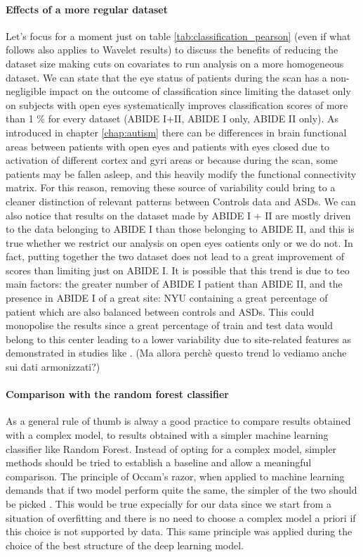 \documentclass[10pt]{report}
\begin{document}
\paragraph{Effects of a more regular dataset}
Let's focus for a moment just on table \ref{tab:classification_pearson} (even if what follows also applies to Wavelet results) to discuss the benefits of reducing the dataset size making cuts on covariates to run analysis on a more homogeneous dataset.
We can state that the eye status of patients during the scan has a non-negligible impact on the outcome of classification since limiting the dataset only on subjects with open eyes systematically improves classification scores of more than 1 \% for every dataset (ABIDE I+II, ABIDE I only, ABIDE II only).
As introduced in chapter \ref{chap:autism} there can be differences in brain functional areas between patients with open eyes and patients with eyes closed due to activation of different cortex and gyri areas or because during the scan, some patients may be fallen asleep, and this heavily modify the functional connectivity matrix.
For this reason, removing these source of variability could bring to a cleaner distinction of relevant patterns between Controls data and ASDs.
We can also notice that results on the dataset made by ABIDE I + II are mostly driven to the data belonging to ABIDE I than those belonging to ABIDE II, and this is true whether we restrict our analysis on open eyes oatients only or we do not.
In fact, putting together the two dataset does not lead to a great improvement of scores than limiting just on ABIDE I.
It is possible that this trend is due to teo main factors: the greater number of ABIDE I patient than ABIDE II, and the presence in ABIDE I of a great site: NYU containing a great percentage of patient which are also balanced between controls and ASDs.
This could monopolise the results since a great percentage of train and test data would belong to this center leading to a lower variability due to site-related features as demonstrated in studies like \cite{spera-2019}.
(Ma allora perchè questo trend lo vediamo anche sui dati armonizzati?)


\paragraph{Comparison with the random forest classifier}
As a general rule of thumb is alway a good practice to compare results obtained with a complex model, to results obtained with a simpler machine learning classifier like Random Forest. Instead of opting for a complex model, simpler methods should be tried to establish a baseline and allow a meaningful comparison. The principle of Occam's razor, when applied to machine learning demands that if two model perform quite the same, the simpler of the two should be picked \cite{domingos-1999}. This would be true expecially for our data since we start from a situation of overfitting and there is no need to choose a complex model a priori if this choice is not supported by data. This same principle was applied during the choice of the best structure of the deep learning model.
\end{document}
